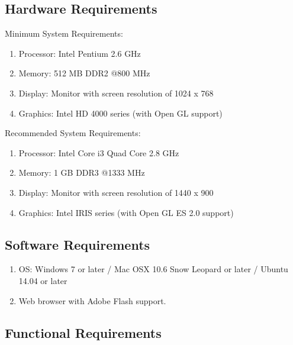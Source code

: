 \documentclass[12pt,a4paper]{article}
\begin{document}
\subsection{Hardware Requirements}
Minimum System Requirements:
\begin{enumerate}
\item Processor: Intel Pentium 2.6 GHz 
\item Memory: 512 MB DDR2 @800 MHz
\item Display: Monitor with screen resolution of 1024 x 768
\item Graphics: Intel HD 4000 series (with Open GL support)
\end{enumerate}
Recommended System Requirements:
\begin{enumerate}
\item Processor: Intel Core i3 Quad Core 2.8 GHz 
\item Memory: 1 GB DDR3 @1333 MHz
\item Display: Monitor with screen resolution of 1440 x 900
\item Graphics: Intel IRIS series (with Open GL ES 2.0 support)
\end{enumerate}

\subsection{Software Requirements}
\begin{enumerate}
\item OS: Windows 7 or later / Mac OSX 10.6 Snow Leopard or later / Ubuntu 14.04 or later
\item Web browser with Adobe Flash support.\cite{adobe} 
\end{enumerate}

\subsection{Functional Requirements}
\end{document}
